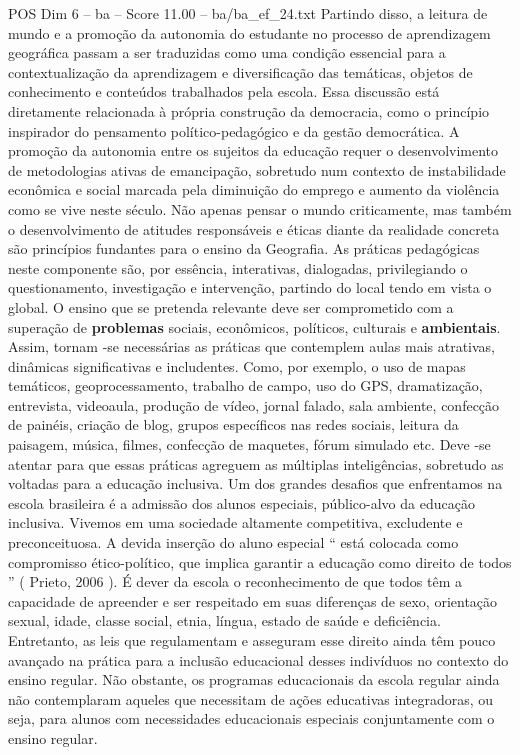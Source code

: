 \begin{textsample}{POS Dim 6 – ba – Score 11.00 – ba/ba\_ef\_24.txt}
Partindo disso, a leitura de mundo e a promoção da autonomia do estudante no processo de aprendizagem geográfica passam a ser traduzidas como uma condição essencial para a contextualização da aprendizagem e diversificação das temáticas, objetos de conhecimento e conteúdos trabalhados pela escola.
Essa discussão está diretamente relacionada à própria construção da democracia, como o princípio inspirador do pensamento político-pedagógico e da gestão democrática.
A promoção da autonomia entre os sujeitos da educação requer o desenvolvimento de metodologias ativas de emancipação, sobretudo num contexto de instabilidade econômica e social marcada pela diminuição do emprego e aumento da violência como se vive neste século.
Não apenas pensar o mundo criticamente, mas também o desenvolvimento de atitudes responsáveis e éticas diante da realidade concreta são princípios fundantes para o ensino da Geografia.
As práticas pedagógicas neste componente são, por essência, interativas, dialogadas, privilegiando o questionamento, investigação e intervenção, partindo do local tendo em vista o global.
O ensino que se pretenda relevante deve ser comprometido com a superação de \textbf{problemas} sociais, econômicos, políticos, culturais e \textbf{ambientais}.
Assim, tornam -se necessárias as práticas que contemplem aulas mais atrativas, dinâmicas significativas e includentes.
Como, por exemplo, o uso de mapas temáticos, geoprocessamento, trabalho de campo, uso do GPS, dramatização, entrevista, videoaula, produção de vídeo, jornal falado, sala ambiente, confecção de painéis, criação de blog, grupos específicos nas redes sociais, leitura da paisagem, música, filmes, confecção de maquetes, fórum simulado etc.
Deve -se atentar para que essas práticas agreguem as múltiplas inteligências, sobretudo as voltadas para a educação inclusiva.
Um dos grandes desafios que enfrentamos na escola brasileira é a admissão dos alunos especiais, público-alvo da educação inclusiva.
Vivemos em uma sociedade altamente competitiva, excludente e preconceituosa.
A devida inserção do aluno especial “ está colocada como compromisso ético-político, que implica garantir a educação como direito de todos ” ( Prieto, 2006 ).
É dever da escola o reconhecimento de que todos têm a capacidade de apreender e ser respeitado em suas diferenças de sexo, orientação sexual, idade, classe social, etnia, língua, estado de saúde e deficiência.
Entretanto, as leis que regulamentam e asseguram esse direito ainda têm pouco avançado na prática para a inclusão educacional desses indivíduos no contexto do ensino regular.
Não obstante, os programas educacionais da escola regular ainda não contemplaram aqueles que necessitam de ações educativas integradoras, ou seja, para alunos com necessidades educacionais especiais conjuntamente com o ensino regular.

\end{textsample}
